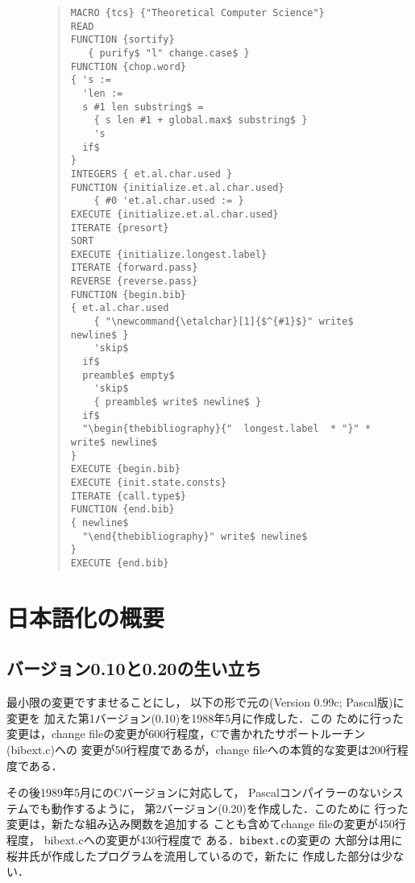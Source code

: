 \begin{figure}[h]
{\baselineskip=11pt
\begin{quote}
\begin{verbatim}
MACRO {tcs} {"Theoretical Computer Science"}  
READ
FUNCTION {sortify}
   { purify$ "l" change.case$ }
FUNCTION {chop.word}
{ 's :=
  'len :=
  s #1 len substring$ =
    { s len #1 + global.max$ substring$ }
    's
  if$
}
INTEGERS { et.al.char.used }
FUNCTION {initialize.et.al.char.used}
    { #0 'et.al.char.used := }
EXECUTE {initialize.et.al.char.used}
ITERATE {presort}
SORT
EXECUTE {initialize.longest.label}
ITERATE {forward.pass}
REVERSE {reverse.pass}
FUNCTION {begin.bib}
{ et.al.char.used
    { "\newcommand{\etalchar}[1]{$^{#1}$}" write$ newline$ }
    'skip$
  if$
  preamble$ empty$
    'skip$
    { preamble$ write$ newline$ }
  if$
  "\begin{thebibliography}{"  longest.label  * "}" * write$ newline$
}
EXECUTE {begin.bib}
EXECUTE {init.state.consts}
ITERATE {call.type$}
FUNCTION {end.bib}
{ newline$
  "\end{thebibliography}" write$ newline$
}
EXECUTE {end.bib}
\end{verbatim}
\end{quote}
}
\end{figure}
\section{日本語化の概要}
\subsection{バージョン0.10と0.20の生い立ち}
最小限の変更ですませることにし，
以下の形で元の\BibTeX (Version 0.99c; Pascal版)に変更を
加えた第1バージョン(0.10)を1988年5月に作成した．この
ために行った変更は，change
fileの変更が600行程度，Cで書かれたサポートルーチン(bibext.c)への
変更が50行程度であるが，change fileへの本質的な変更は200行程度である．

その後1989年5月に\BibTeX のCバージョンに対応して，
Pascalコンパイラーのないシステムでも動作するように，
第2バージョン(0.20)を作成した．このために
行った変更は，新たな組み込み関数を追加する
ことも含めてchange fileの変更が450行程度，
bibext.cへの変更が430行程度で
ある．{\tt bibext.c}の変更の
大部分は\JTeX 用に桜井氏が作成したプログラムを流用しているので，新たに
作成した部分は少ない．

